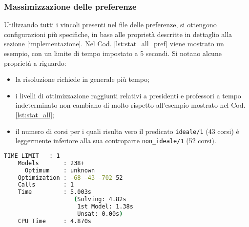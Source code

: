 \subsubsection*{Massimizzazione delle preferenze}
Utilizzando tutti i vincoli presenti nel file delle preferenze, si ottengono 
configurazioni più specifiche, in base alle proprietà descritte in dettaglio
alla sezione \ref{implementazione}. 
Nel Cod. \ref{lst:stat_all_pref} viene mostrato un esempio, con un limite 
di tempo impostato a 5 secondi. Si notano alcune proprietà a riguardo:
\begin{itemize}
    \item la risoluzione richiede in generale più tempo;
    \item i livelli di ottimizzazione raggiunti relativi a presidenti e 
        professori a tempo indeterminato non cambiano di molto rispetto 
        all'esempio mostrato nel Cod. \ref{lst:stat_all};
		\item il numero di corsi per i quali risulta vero il predicato
		\texttt{ideale/1} (43 corsi) è leggermente inferiore alla sua controparte
		\texttt{non\_ideale/1} (52 corsi).
\end{itemize}

\begin{lstlisting}[language=bash, captionpos=b, 
    caption={Statistiche clingo per tutti i corsi con preferenze massime.}, 
    label={lst:stat_all_pref},
    backgroundcolor=\color{lightgray!20},
    basicstyle=\ttfamily\footnotesize]
    TIME LIMIT   : 1
    Models       : 238+
      Optimum    : unknown
    Optimization : -68 -43 -702 52
    Calls        : 1
    Time         : 5.003s 
                    (Solving: 4.82s 
                     1st Model: 1.38s 
                     Unsat: 0.00s)
    CPU Time     : 4.870s
\end{lstlisting}
